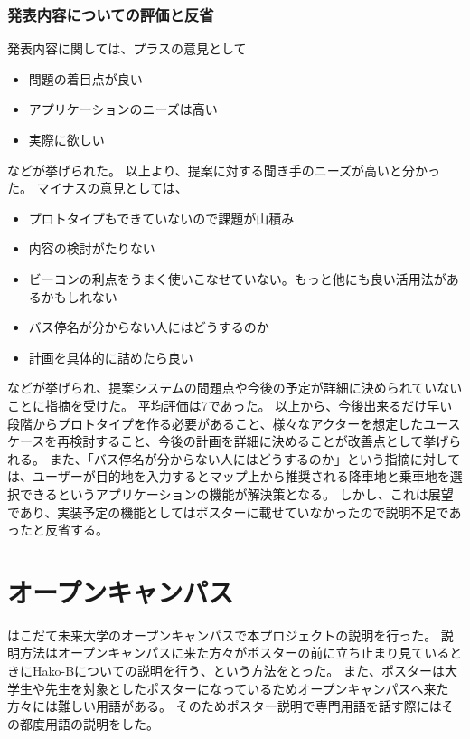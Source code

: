 \documentclass[openany,11pt,papersize]{jsbook}
\begin{document}
\subsubsection{発表内容についての評価と反省}
発表内容に関しては、プラスの意見として
\begin{itemize}

\item 問題の着目点が良い
\item アプリケーションのニーズは高い
\item 実際に欲しい

\end{itemize}
などが挙げられた。
以上より、提案に対する聞き手のニーズが高いと分かった。
マイナスの意見としては、
\begin{itemize}

\item プロトタイプもできていないので課題が山積み
\item 内容の検討がたりない
\item ビーコンの利点をうまく使いこなせていない。もっと他にも良い活用法があるかもしれない
\item バス停名が分からない人にはどうするのか
\item 計画を具体的に詰めたら良い

\end{itemize}
などが挙げられ、提案システムの問題点や今後の予定が詳細に決められていないことに指摘を受けた。
平均評価は7であった。
以上から、今後出来るだけ早い段階からプロトタイプを作る必要があること、様々なアクターを想定したユースケースを再検討すること、今後の計画を詳細に決めることが改善点として挙げられる。
また、「バス停名が分からない人にはどうするのか」という指摘に対しては、ユーザーが目的地を入力するとマップ上から推奨される降車地と乗車地を選択できるというアプリケーションの機能が解決策となる。
しかし、これは展望であり、実装予定の機能としてはポスターに載せていなかったので説明不足であったと反省する。


\section{オープンキャンパス}
はこだて未来大学のオープンキャンパスで本プロジェクトの説明を行った。
説明方法はオープンキャンパスに来た方々がポスターの前に立ち止まり見ているときにHako-Bについての説明を行う、という方法をとった。
また、ポスターは大学生や先生を対象としたポスターになっているためオープンキャンパスへ来た方々には難しい用語がある。
そのためポスター説明で専門用語を話す際にはその都度用語の説明をした。
\end{document}
